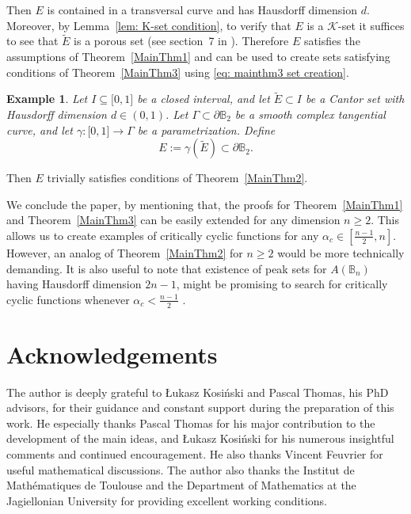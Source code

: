 \documentclass[a4paper,12pt]{amsart}
\newtheorem{exam}[thm]{Example}
\theoremstyle{definition}
\theoremstyle{remark}
\def\Bn{\mathbb{B}_n}
\begin{document}
Then $E$ is contained in a transversal curve and has Hausdorff dimension $d$. Moreover, by Lemma~{\ref{lem: K-set condition}}, to verify that $E$ is a $\mathcal{K}$-set it suffices to see that $\tilde{E}$ is a porous set (see section~{7} in \cite{Noell_peakset_survey}).
Therefore $E$ satisfies the assumptions of Theorem~\ref{MainThm1} and can be used to create sets satisfying conditions of Theorem~{\ref{MainThm3}} using \eqref{eq: mainthm3 set creation}. 

\begin{exam}
Let $I \subseteq \mathbb [0,1]$ be a closed interval, and let $\tilde E \subset I$
be a Cantor set with Hausdorff dimension $d\in(0,1)$.
Let $\Gamma \subset \partial\mathbb B_2$ be a smooth complex tangential curve,
and let $\gamma:\mathbb [0,1]\to\Gamma$ be a parametrization.
Define
\begin{equation*}
    E := \gamma(\tilde E)\subset\partial\mathbb B_2 .
\end{equation*}
\end{exam}
Then $E$ trivially satisfies conditions of Theorem~{\ref{MainThm2}}.

We conclude the paper, by mentioning that, the proofs for Theorem~{\ref{MainThm1}} and Theorem~{\ref{MainThm3}} can be easily extended for any dimension $n \geq 2$. This allows us to create examples of critically cyclic functions for any $\alpha_c \in [\frac{n-1}{2}, n]$. However, an analog of Theorem~{\ref{MainThm2}} for $n \geq 2$ would be more technically demanding. It is also useful to note that existence of peak sets for $A(\Bn)$ having Hausdorff dimension $2n-1$, might be promising to search for critically cyclic functions whenever $\alpha_c < \frac{n-1}{2}$  \cite{Henriksen1982}.

\section*{Acknowledgements}
The author is deeply grateful to Łukasz Kosiński and Pascal Thomas, his PhD advisors, for their guidance and constant support during the preparation of this work. He especially thanks Pascal Thomas for his major contribution to the development of the main ideas, and Łukasz Kosiński for his numerous insightful comments and continued encouragement. He also thanks Vincent Feuvrier for useful mathematical discussions. The author also thanks the Institut de Mathématiques de Toulouse and the Department of Mathematics at the Jagiellonian University for providing excellent working conditions.
\end{document}

